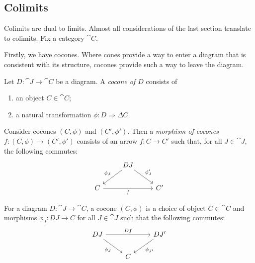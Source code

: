 \documentclass{article}
\begin{document}


\subsection{Colimits}

Colimits are dual to limits. Almost all considerations of the last section translate
to colimits. Fix a category $\cat{C}$.

Firstly, we have cocones. Where cones provide a way to enter a diagram that is consistent
with its structure, cocones provide such a way to leave the diagram.

\begin{definition}
  Let $D:\cat{J}\to\cat{C}$ be a diagram. A \emph{cocone of $D$} consists of
  \begin{enumerate}
    \item an object $C\in\cat{C}$;
    \item a natural transformation $\phi:D\Rightarrow\Delta C$.
  \end{enumerate}
  Consider cocones $(C,\phi)$ and $(C',\phi')$. Then a \emph{morphism of cocones $f:(C,\phi)\to(C',\phi')$} consists of
  an arrow $f:C\to C'$ such that, for all $J\in\cat{J}$, the following
  commutes:
  \begin{equation}
    \begin{tikzcd}
  & DJ \\
      C && {C'}
      \arrow["f"', from=2-1, to=2-3]
      \arrow["{\phi_J'}", from=1-2, to=2-3]
      \arrow["{\phi_J}"', from=1-2, to=2-1]
    \end{tikzcd}
  \end{equation}
\end{definition}

For a diagram $D:\cat{J}\to\cat{C}$, a cocone $(C,\phi)$ is a choice of object
$C\in\cat{C}$ and morphisms $\phi_J:DJ\to C$ for all $J\in\cat{J}$ such that
the following commutes:
\begin{equation}
  \begin{tikzcd}
    DJ && {DJ'} \\
       & C
       \arrow["Df", from=1-1, to=1-3]
       \arrow["{\phi_{J'}}", from=1-3, to=2-2]
       \arrow["{\phi_J}"', from=1-1, to=2-2]
  \end{tikzcd}
\end{equation}
\end{document}
